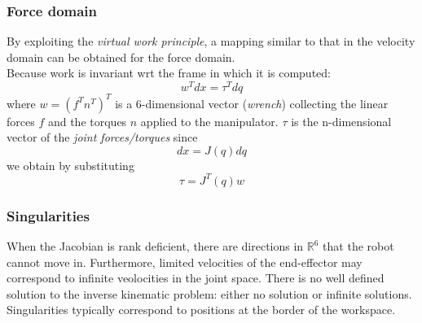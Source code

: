 \documentclass{book}
\begin{document}
\subsubsection{Force domain}
By exploiting the \emph{virtual work principle}, a mapping similar to that in the velocity domain can be obtained for the force domain.\\
Because work is invariant wrt the frame in which it is computed:
\[
    w^Tdx=\tau^Tdq
\]
where $w=(f^T n^T)^T$ is a 6-dimensional vector (\emph{wrench}) collecting the linear forces $f$ and the torques $n$ applied to the manipulator. $\tau$ is the n-dimensional vector of the \emph{joint forces/torques}
since 
\[
    dx=J(q)dq
\]
we obtain by substituting
\[
    \tau = J^T(q)w
\]
\subsubsection{Singularities}
When the Jacobian is rank deficient, there are directions in $\mathbb{R}^6$ that the robot cannot move in. Furthermore, limited velocities of the end-effector may correspond to infinite veolocities in the joint space. There is no well defined solution to the inverse kinematic problem: either no solution or infinite solutions. Singularities typically correspond to positions at the border of the workspace.\\
\end{document}
